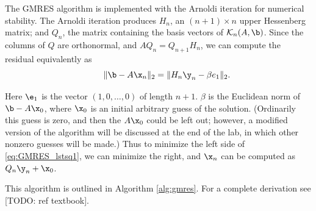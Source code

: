 The GMRES algorithm is implemented with the Arnoldi iteration for numerical stability.  The Arnoldi iteration produces $H_n$, an $(n+1)\times n$ upper Hessenberg matrix; and $Q_n$, the matrix containing the basis vectors of $\mathcal{K}_n(A, \b)$.  Since the columns of $Q$ are orthonormal, and $AQ_n = Q_{n+1}H_n$, we can compute the residual equivalently as
\begin{equation}
\qquad \|\b - A\x_n\|_2 = \|H_n \y_n - \beta e_1\|_2.
\label{eq:GMRES_lstsq1}
\end{equation}

Here $\e_1$ is the vector $(1, 0, \ldots, 0)$ of length $n+1$.  $\beta$ is the Euclidean norm of $\b - A\x_0$, where $\x_0$ is an initial arbitrary guess of the solution.  (Ordinarily this guess is zero, and then the $A\x_0$ could be left out; however, a modified version of the algorithm will be discussed at the end of the lab, in which other nonzero guesses will be made.)  Thus to minimize the left side of \ref{eq:GMRES_lstsq1}, we can minimize the right, and $\x_n $ can be computed as $ Q_n \y_n + \x_0$.

This algorithm is outlined in Algorithm \ref{alg:gmres}.
For a complete derivation see [TODO: ref textbook].

